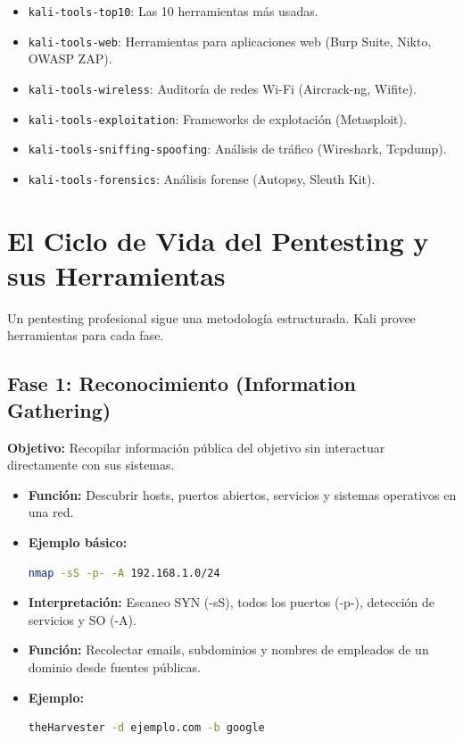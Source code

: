 \documentclass[11pt,a4paper]{article}
\begin{document}
\begin{itemize}[leftmargin=*]
  \item \texttt{kali-tools-top10}: Las 10 herramientas más usadas.
  \item \texttt{kali-tools-web}: Herramientas para aplicaciones web (Burp Suite, Nikto, OWASP ZAP).
  \item \texttt{kali-tools-wireless}: Auditoría de redes Wi-Fi (Aircrack-ng, Wifite).
  \item \texttt{kali-tools-exploitation}: Frameworks de explotación (Metasploit).
  \item \texttt{kali-tools-sniffing-spoofing}: Análisis de tráfico (Wireshark, Tcpdump).
  \item \texttt{kali-tools-forensics}: Análisis forense (Autopsy, Sleuth Kit).
\end{itemize}

\section{El Ciclo de Vida del Pentesting y sus Herramientas}
Un pentesting profesional sigue una metodología estructurada. Kali provee herramientas para cada fase.

\subsection{Fase 1: Reconocimiento (Information Gathering)}
\textbf{Objetivo:} Recopilar información pública del objetivo sin interactuar directamente con sus sistemas.

\begin{herramienta}
\begin{itemize}[leftmargin=*]
  \item \textbf{Función:} Descubrir hosts, puertos abiertos, servicios y sistemas operativos en una red.
  \item \textbf{Ejemplo básico:}
  \begin{lstlisting}[language=bash]
nmap -sS -p- -A 192.168.1.0/24
  \end{lstlisting}
  \item \textbf{Interpretación:} Escaneo SYN (-sS), todos los puertos (-p-), detección de servicios y SO (-A).
\end{itemize}
\end{herramienta}

\begin{herramienta}
\begin{itemize}[leftmargin=*]
  \item \textbf{Función:} Recolectar emails, subdominios y nombres de empleados de un dominio desde fuentes públicas.
  \item \textbf{Ejemplo:}
  \begin{lstlisting}[language=bash]
theHarvester -d ejemplo.com -b google
  \end{lstlisting}
\end{itemize}
\end{herramienta}
\end{document}

